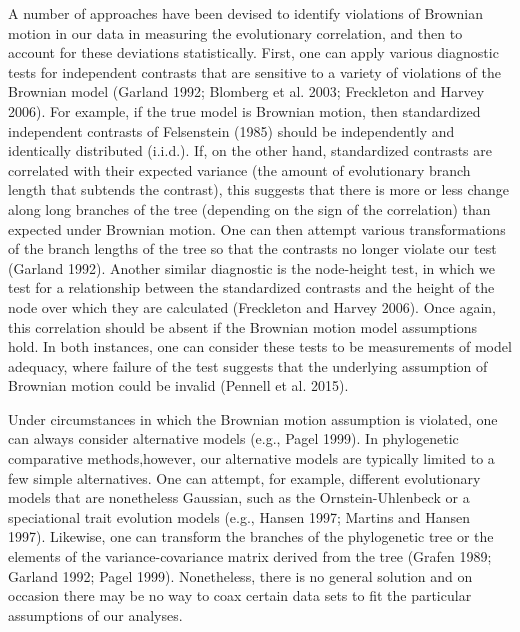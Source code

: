 \documentclass[fleqn,10pt,lineno]{wlpeerj} %
\begin{document}
A number of approaches have been devised to identify violations of Brownian motion in our data in measuring the evolutionary correlation, and then to account for these deviations statistically. First, one can apply various diagnostic tests for independent contrasts that are sensitive to a variety of violations of the Brownian model (Garland 1992; Blomberg et al. 2003; Freckleton and Harvey 2006). For example, if the true model is Brownian motion, then standardized independent contrasts of Felsenstein (1985) should be independently and identically distributed (i.i.d.). If, on the other hand, standardized contrasts are correlated with their expected variance (the amount of evolutionary branch length that subtends the contrast), this suggests that there is more or less change along long branches of the tree (depending on the sign of the correlation) than expected under Brownian motion. One can then attempt various transformations of the branch lengths of the tree so that the contrasts no longer violate our test (Garland 1992). Another similar diagnostic is the node-height test, in which we test for a relationship between the standardized contrasts and the height of the node over which they are calculated (Freckleton and Harvey 2006). Once again, this correlation should be absent if the Brownian motion model assumptions hold. In both instances, one can consider these tests to be measurements of model adequacy, where failure of the test suggests that the underlying assumption of Brownian motion could be invalid (Pennell et al. 2015).

Under circumstances in which the Brownian motion assumption is violated, one can always consider alternative models (e.g., Pagel 1999). In phylogenetic comparative methods,however, our alternative models are typically limited to a few simple alternatives. One can attempt, for example, different evolutionary models that are nonetheless Gaussian, such as the Ornstein-Uhlenbeck or a speciational trait evolution models (e.g., Hansen 1997; Martins and Hansen 1997). Likewise, one can transform the branches of the phylogenetic tree or the elements of the variance-covariance matrix derived from the tree (Grafen 1989; Garland 1992; Pagel 1999). Nonetheless, there is no general solution and on occasion there may be no way to coax certain data sets to fit the particular assumptions of our analyses.
\end{document}

